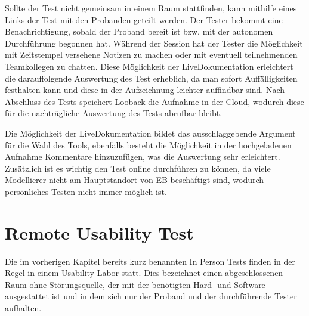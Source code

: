 Sollte der Test nicht gemeinsam in einem Raum stattfinden, kann mithilfe eines Links der Test mit den Probanden geteilt werden.
Der Tester bekommt eine Benachrichtigung, sobald der Proband bereit ist bzw. mit der autonomen Durchführung begonnen hat.
Während der Session hat der Tester die Möglichkeit mit Zeitstempel versehene Notizen zu machen oder mit eventuell teilnehmenden Teamkollegen zu chatten.
Diese Möglichkeit der Live\-Dokumentation erleichtert die darauffolgende Auswertung des Test erheblich, da man sofort Auffälligkeiten festhalten kann und diese in der Aufzeichnung leichter auffindbar sind.
Nach Abschluss des Tests speichert Looback die Aufnahme in der Cloud, wodurch diese für die nachträgliche Auswertung des Tests abrufbar bleibt. \cite{.10.01.2020}

Die Möglichkeit der Live\-Dokumentation bildet das ausschlaggebende Argument für die Wahl des Tools, ebenfalls besteht die Möglichkeit in der hochgeladenen Aufnahme Kommentare hinzuzufügen, was die Auswertung sehr erleichtert.
Zusätzlich ist es wichtig den Test online durchführen zu können, da viele Modellierer nicht am Hauptstandort von EB beschäftigt sind, wodurch persönliches Testen nicht immer möglich ist.

\section{Remote Usability Test}
Die im vorherigen Kapitel bereits kurz benannten \glqq In Person\grqq{} Tests finden in der Regel in einem Usability Labor statt.
Dies bezeichnet einen abgeschlossenen Raum ohne Störungsquelle, der mit der benötigten Hard- und Software ausgestattet ist und in dem sich nur der Proband und der durchführende Tester aufhalten.

